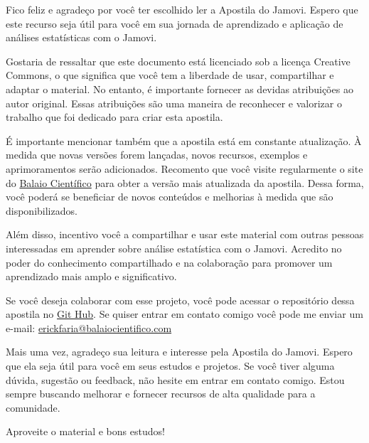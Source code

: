 
Fico feliz e agradeço por você ter escolhido ler a Apostila do Jamovi. Espero que este recurso seja útil para você em sua jornada de aprendizado e aplicação de análises estatísticas com o Jamovi.

Gostaria de ressaltar que este documento está licenciado sob a licença Creative Commons, o que significa que você tem a liberdade de usar, compartilhar e adaptar o material. No entanto, é importante fornecer as devidas atribuições ao autor original. Essas atribuições são uma maneira de reconhecer e valorizar o trabalho que foi dedicado para criar esta apostila.

É importante mencionar também que a apostila está em constante atualização. À medida que novas versões forem lançadas, novos recursos, exemplos e aprimoramentos serão adicionados. Recomento que você visite regularmente o site do \href{https://www.balaiocientifico.com/jamovi/apostila-de-jamovi/} {Balaio Científico} para obter a versão mais atualizada da apostila. Dessa forma, você poderá se beneficiar de novos conteúdos e melhorias à medida que são disponibilizados.

Além disso, incentivo você a compartilhar e usar este material com outras pessoas interessadas em aprender sobre análise estatística com o Jamovi. Acredito no poder do conhecimento compartilhado e na colaboração para promover um aprendizado mais amplo e significativo.

Se você deseja colaborar com esse projeto, você pode acessar o repositório dessa apostila no \href{https://github.com/balaio-cientifico/apostila_jamovi}{Git Hub}. Se quiser entrar em contato comigo você pode me enviar um e-mail: \href{mailto:erickfaria@balaiocientifico.com}{erickfaria@balaiocientifico.com}

Mais uma vez, agradeço sua leitura e interesse pela Apostila do Jamovi. Espero que ela seja útil para você em seus estudos e projetos. Se você tiver alguma dúvida, sugestão ou feedback, não hesite em entrar em contato comigo. Estou sempre buscando melhorar e fornecer recursos de alta qualidade para a comunidade.

Aproveite o material e bons estudos!

